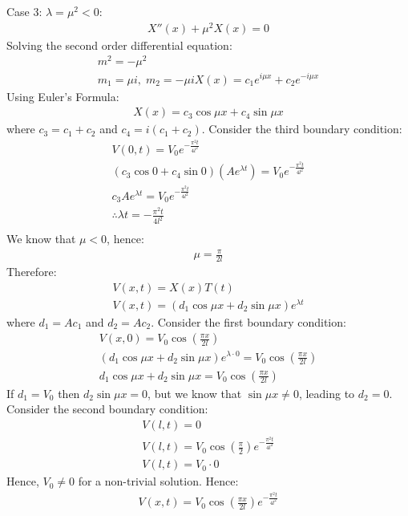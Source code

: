\documentclass[11pt]{article}
\numberwithin{equation}{section}
\begin{document}
Case 3: $\lambda = \mu^2 < 0$:
\begin{gather}
    X''(x) + \mu^2 X(x) = 0
\end{gather}
Solving the second order differential equation:
\begin{gather}
    m^2 = - \mu^2 \\
    m_1 = \mu i, \; m_2 = -\mu i
    X(x) = c_1 e^{i\mu x} + c_2 e^{-i\mu x}
\end{gather}
Using Euler's Formula:
\begin{gather}
    X(x) = c_3 \cos\mu x + c_4 \sin \mu x
\end{gather}
where $c_3 = c_1 + c_2$ and $c_4 = i\left(c_1 + c_2\right)$. Consider the third boundary condition:
\begin{gather}
    V(0,t) = V_0 e^{-\frac{\pi^2 t}{4l^2}}\\
    \left(c_3 \cos 0 + c_4 \sin 0\right)\left(Ae^{\lambda t}\right) = V_0 e^{-\frac{\pi^2 t}{4l^2}}\\
    c_3 A e^{\lambda t} = V_0 e^{-\frac{\pi^2 t}{4l^2}}\\
    \therefore \lambda t = - \frac{\pi^2 t}{4l^2}\\
\end{gather}
We know that $\mu < 0$, hence:
\begin{gather}
    \mu = \frac{\pi}{2l}
\end{gather}
Therefore:
\begin{gather}
    V(x,t) = X(x)T(t)\\
    V(x,t) = \left(d_1 \cos \mu x + d_2 \sin \mu x\right) e^{\lambda t}
\end{gather}
where $d_1 = Ac_1$ and $d_2 = Ac_2$. Consider the first boundary condition:
\begin{gather}
    V(x,0) = V_0 \cos \left(\frac{\pi x}{2l}\right)\\
    \left(d_1 \cos \mu x + d_2 \sin \mu x\right) e^{\lambda \cdot 0} = V_0 \cos \left(\frac{\pi x}{2l}\right)\\
    d_1 \cos \mu x + d_2 \sin \mu x = V_0 \cos \left(\frac{\pi x}{2l}\right)
\end{gather}
If $d_1 = V_0$ then $d_2 \sin \mu x = 0$, but we know that $\sin \mu x \neq 0$, leading to $d_2 = 0$. Consider the second boundary condition:
\begin{gather}
    V(l,t) = 0\\
    V(l,t) = V_0 \cos \left(\frac{\pi}{2}\right)e^{-\frac{\pi^2 t}{4l^2}}\\
    V(l,t) = V_0 \cdot 0 
\end{gather}
Hence, $V_0 \neq 0$ for a non-trivial solution. Hence:
\begin{gather}
    V(x,t) = V_0 \cos \left(\frac{\pi x}{2l}\right)e^{-\frac{\pi^2 t}{4l^2}}
\end{gather}
\end{document}
